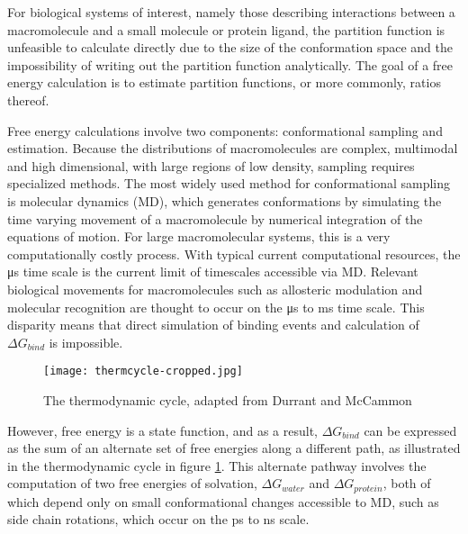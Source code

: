 For biological systems of interest, namely those describing interactions between a macromolecule and a small molecule or protein ligand, the partition function is unfeasible to calculate directly due to the size of the conformation space and the impossibility of writing out the partition function analytically\cite{christ2010basic}. The goal of a free energy calculation is to estimate partition functions, or more commonly, ratios thereof.

Free energy calculations involve two components\cite{shirts2007alchemical,christ2010basic}: conformational sampling and estimation. Because the distributions of macromolecules are complex, multimodal and high dimensional\cite{shirts2007alchemical,christ2010basic}, with large regions of low density, sampling requires specialized methods. The most widely used method for conformational sampling is molecular dynamics (MD)\cite{christ2010basic}, which generates conformations by simulating the time varying movement of a macromolecule by numerical integration of the equations of motion. For large macromolecular systems, this is a very computationally costly process. With typical current computational resources, the \si{\micro\second} time scale is the current limit of timescales accessible via MD\cite{vandivort2008long,salomon2013routine}. Relevant biological movements for macromolecules such as allosteric modulation and molecular recognition are thought to occur on the \si{\micro\second} to \si{\milli\second} time scale\cite{harvey2012high}. This disparity means that direct simulation of binding events and calculation of $\Delta G_{bind}$ is impossible. 

\begin{figure}
\centering
\texttt{[image: thermcycle-cropped.jpg]}
\caption[The thermodynamic cycle]{The thermodynamic cycle, adapted from Durrant and McCammon\cite{durrant2011molecular}}
\label{thermcycle}
\end{figure}

However, free energy is a state function, and as a result, $\Delta G_{bind}$ can be expressed as the sum of an alternate set of free energies along a different path, as illustrated in the thermodynamic cycle in figure \ref{thermcycle}. This alternate pathway involves the computation of two free energies of solvation, $\Delta G_{water}$ and $\Delta G_{protein}$, both of which depend only on small conformational changes accessible to MD, such as side chain rotations, which occur on the \si{\pico\second} to \si{\nano\second} scale\cite{harvey2012high}.

